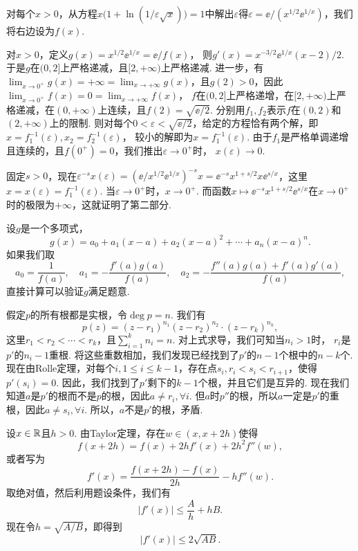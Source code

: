 \begin{ans}
  对每个$x>0$，从方程$x\big( 1+\ln (1/\varepsilon\sqrt x) \big)=1$中解出$\varepsilon$得$\varepsilon=\ee/(x^{1/2}\ee^{1/x})$，我们将右边设为$f(x)$.

  对$x>0$，定义$g(x)=x^{1/2}\ee^{1/x}=\ee/f(x)$， 则$g'(x)=x^{-3/2}\ee^{1/x}(x-2)/2$. 于是$g$在$(0,2]$上严格递减，且$[2,+\infty)$上严格递减. 进一步，有$\lim_{x\to0^+}g(x)=+\infty=\lim_{x\to+\infty}g(x)$，且$g(2)>0$，因此$\lim_{x\to0^+}f(x)=0=\lim_{x\to+\infty}f(x)$， $f$在$(0,2]$上严格递增，在$[2,+\infty)$上严格递减，在$(0,+\infty)$上连续，且$f(2)=\sqrt{\ee/2}$. 分别用$f_1,f_2$表示$f$在$(0,2)$和$(2,+\infty)$上的限制. 则对每个$0<\varepsilon<\sqrt{\ee/2}$，给定的方程恰有两个解，即$x=f_1^{-1}(\varepsilon),x_2=f_2^{-1}(\varepsilon)$， 较小的解即为$x=f_1^{-1}(\varepsilon)$. 由于$f_1$是严格单调递增且连续的，且$f(0^+)=0$，我们推出$\varepsilon\to0^+$时， $x(\varepsilon)\to0$.

  固定$s>0$，现在$\varepsilon^{-s}x(\varepsilon)
  =(\ee/x^{1/2}\ee^{1/x})^{-s}x=\ee^{-s}x^{1+s/2}x\ee^{s/x}$，这里$x=x(\varepsilon)=f_1^{-1}(\varepsilon)$. 当$\varepsilon\to0^+$时，$x\to0^+$. 而函数$x\mapsto
  \ee^{-s}x^{1+s/2}\ee^{s/x}$在$x\to0^+$时的极限为$+\infty$，这就证明了第二部分.
\end{ans}

\begin{ans}
  设$g$是一个多项式，
  \[ g(x)=a_0+a_1(x-a)+a_2(x-a)^2+\cdots+a_n(x-a)^n. \]
  如果我们取
  \[ a_0=\frac1{f(a)},\quad a_1=-\frac{f'(a)g(a)}{f(a)},
  \quad a_2=-\frac{f''(a)g(a)+f'(a)g'(a)}{f(a)}, \]
  直接计算可以验证$g$满足题意.
\end{ans}

\begin{ans}
  假定$p$的所有根都是实根，令$\deg p=n$. 我们有
  \[ p(z)=(z-r_1)^{n_1}(z-r_2)^{n_2}\cdot(z-r_k)^{n_k}, \]
  这里$r_1<r_2<\cdots<r_k$，且$\sum_{i=1}^k n_i=n$. 对上式求导，我们可知当$n_i>1$时， $r_i$是$p'$的$n_i-1$重根. 将这些重数相加，我们发现已经找到了$p'$的$n-1$个根中的$n-k$个. 现在由Rolle定理，对每个$i,1\le i\le k-1$，存在点$s_i,r_i<s_i<r_{i+1}$，使得$p'(s_i)=0$. 因此，我们找到了$p'$剩下的$k-1$个根，并且它们是互异的. 现在我们知道$a$是$p'$的根而不是$p$的根，因此$a\ne r_i,\forall i$. 但$a$时$p''$的根，所以$a$一定是$p'$的重根，因此$a\ne s_i,\forall i$. 所以，$a$不是$p'$的根，矛盾.
\end{ans}

\begin{ans}
  设$x\in\mathbb R$且$h>0$. 由Taylor定理，存在$w\in(x,x+2h)$使得
  \[ f(x+2h)=f(x)+2hf'(x)+2h^2f''(w), \]
  或者写为
  \[ f'(x)=\frac{f(x+2h)-f(x)}{2h} -hf''(w). \]
  取绝对值，然后利用题设条件，我们有
  \[|f'(x)|\le \frac Ah+hB.\]
  现在令$h=\sqrt{A/B}$，即得到
  \[ |f'(x)|\le2\sqrt{AB}. \]
\end{ans}

